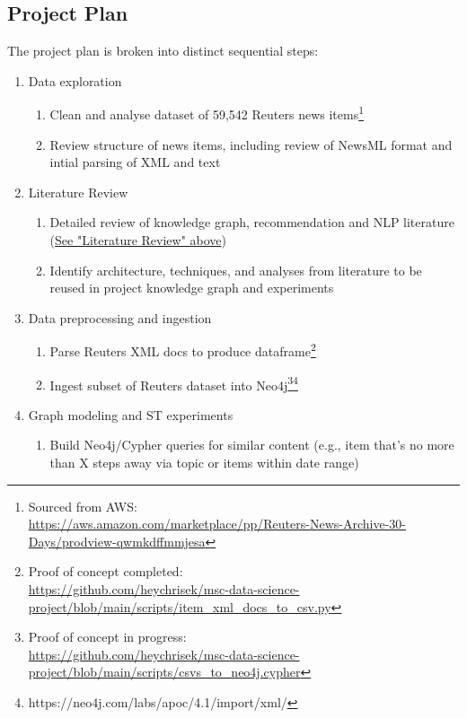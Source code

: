 \documentclass[11pt]{article}   	%
\begin{document}
\subsection{Project Plan}
The project plan is broken into distinct sequential steps:
\begin{enumerate}
\item{Data exploration} \label{sec:PropDataExploration}
  \begin{enumerate}
  \item Clean and analyse dataset of 59,542 Reuters news items\footnote{Sourced from AWS:\\ \url{https://aws.amazon.com/marketplace/pp/Reuters-News-Archive-30-Days/prodview-qwmkdffmmjesa}}
  \item Review structure of news items, including review of NewsML format and intial parsing of XML and text
  \end{enumerate}
\item{Literature Review} \label{sec:PropLiteratureReview}
  \begin{enumerate}
  \item Detailed review of knowledge graph, recommendation and NLP literature (\hyperref[sec:LiteratureReview]{See "Literature Review" above})
  \item Identify architecture, techniques, and analyses from literature to be reused in project knowledge graph and experiments
  \end{enumerate}
\item{Data preprocessing and ingestion} \label{sec:PropDataProcessing}
  \begin{enumerate}
  \item Parse Reuters XML docs to produce dataframe\footnote{Proof of concept completed:\\ \url{https://github.com/heychrisek/msc-data-science-project/blob/main/scripts/item_xml_docs_to_csv.py}}
  \item Ingest subset of Reuters dataset into Neo4j\footnote{Proof of concept in progress:\\ \url{https://github.com/heychrisek/msc-data-science-project/blob/main/scripts/csvs_to_neo4j.cypher}}\footnote{https://neo4j.com/labs/apoc/4.1/import/xml/}
  \end{enumerate}
\item{Graph modeling and ST experiments} \label{sec:PropGraphModeling}
  \begin{enumerate}
  \item Build Neo4j/Cypher queries for similar content (e.g., item that’s no more than X steps away via topic or items within date range)

\end{enumerate}
\end{enumerate}
\end{document}
